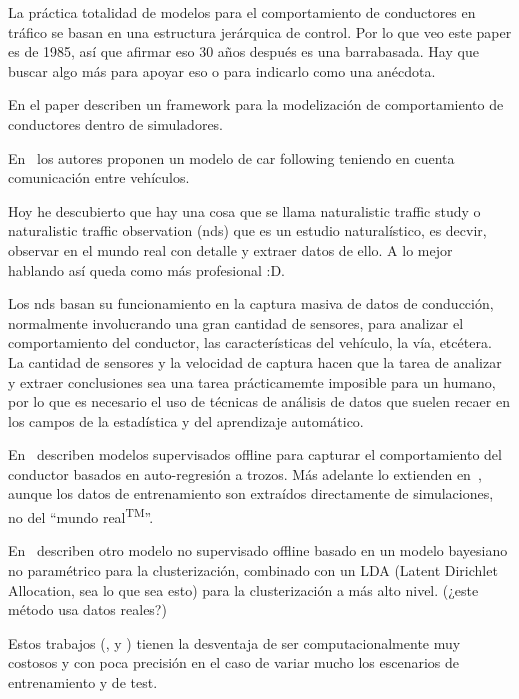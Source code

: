 La práctica totalidad de modelos para el comportamiento de conductores en tráfico se basan en una estructura jerárquica de control\cite{michon1985critical}. Por lo que veo este paper es de 1985, así que afirmar eso 30 años después es una barrabasada. Hay que buscar algo más para apoyar eso o para indicarlo como una anécdota.

En el paper \cite{al2001framework} describen un framework para la modelización de comportamiento de conductores dentro de simuladores.

En~\cite{tang2014new} los autores proponen un modelo de car following teniendo en cuenta comunicación entre vehículos.

\TODO Hoy he descubierto que hay una cosa que se llama naturalistic traffic study o naturalistic traffic observation (\gls{nds}) que es un estudio naturalístico, es decvir, observar en el mundo real con detalle y extraer datos de ello. A lo mejor hablando así queda como más profesional :D.

Los \gls{nds} basan su funcionamiento en la captura masiva de datos de conducción, normalmente involucrando una gran cantidad de sensores, para analizar el comportamiento del conductor, las características del vehículo, la vía, etcétera. La cantidad de sensores y la velocidad de captura hacen que la tarea de analizar y extraer conclusiones  sea una tarea prácticamemte imposible para un humano, por lo que es necesario el uso de técnicas de análisis de datos que suelen recaer en los campos de la estadística y del aprendizaje automático.

En~\cite{sekizawa2007modeling} describen modelos supervisados offline para capturar el comportamiento del conductor basados en auto-regresión a trozos. Más adelante lo extienden en~\cite{terada2010multi}, aunque los datos de entrenamiento son extraídos directamente de simulaciones, no del \enquote{mundo real\textsuperscript{TM}}.

En~\cite{bando2013unsupervised} describen otro modelo no supervisado offline basado en un modelo bayesiano no paramétrico para la clusterización, combinado con un LDA (Latent Dirichlet Allocation, sea lo que sea esto) para la clusterización a más alto nivel. (\TODO ¿este método usa datos reales?)

Estos trabajos (\cite{sekizawa2007modeling}, \cite{terada2010multi} y \cite{bando2013unsupervised}) tienen la desventaja de ser computacionalmente muy costosos y con poca precisión en el caso de variar mucho los escenarios de entrenamiento y de test.

